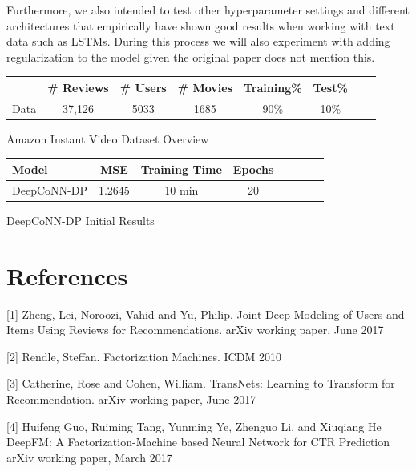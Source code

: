 \documentclass[10pt,twocolumn,letterpaper]{article}
\begin{document}
Furthermore, we also intended to test other hyperparameter settings and different architectures that empirically have shown good results when working with text data such as LSTMs. During this process we will also experiment with adding regularization to the model given the original paper does not mention this.  

\begin{exhibit}
\begin{center}
{\small
\begin{tabular}{l|ccccccc}
\hline
 & \# Reviews & \# Users & \# Movies & Training\% & Test\% \\
\hline
Data & 37,126  & 5033 & 1685 & 90\% & 10\%  \\
\hline
\end{tabular}
}
\end{center}
\caption{Amazon Instant Video Dataset Overview}
\end{exhibit}

\begin{exhibit}
\begin{center}
{\small
\begin{tabular}{l|ccccccc}
\hline
Model & MSE & Training Time & Epochs \\
\hline
DeepCoNN-DP & 1.2645 & 10 min & 20  \\
\hline
\end{tabular}
}
\end{center}
\caption{DeepCoNN-DP Initial Results}
\end{exhibit}


\section{References}

[1] Zheng, Lei, Noroozi, Vahid and Yu, Philip. Joint Deep Modeling of Users
 and Items Using Reviews for Recommendations. arXiv working paper, June 2017

[2] Rendle, Steffan. Factorization Machines. ICDM 2010

[3] Catherine, Rose and Cohen, William. TransNets: Learning to Transform
for Recommendation. arXiv working paper, June 2017

[4] Huifeng Guo, Ruiming Tang, Yunming Ye, Zhenguo Li, and Xiuqiang He
DeepFM: A Factorization-Machine based Neural Network for CTR Prediction
arXiv working paper, March 2017
\end{document}
